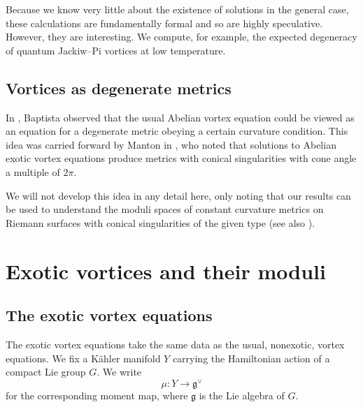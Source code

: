 \documentclass[10pt]{article}
\theoremstyle{definition}
\begin{document}
Because we know very little about the existence of solutions in the general case, these calculations are fundamentally formal and so are highly speculative. However, they are interesting. We compute, for example, the expected degeneracy of quantum Jackiw--Pi vortices at low temperature.

\subsection{Vortices as degenerate metrics}

In \cite{baptistaVDM}, Baptista observed that the usual Abelian vortex equation could be viewed as an equation for a degenerate metric obeying a certain curvature condition. This idea was carried forward by Manton in \cite{mantonFVE}, who noted that solutions to Abelian exotic vortex equations produce metrics with conical singularities with cone angle a multiple of \(2\pi\). 

We will not develop this idea in any detail here, only noting that our results can be used to understand the moduli spaces of constant curvature metrics on Riemann surfaces with conical singularities of the given type (see also \cite{chenCM,eremenkoMC,mazzeoCM}).



\section{Exotic vortices and their moduli}
\label{sec:evm}

\subsection{The exotic vortex equations}

The exotic vortex equations take the same data as the usual, nonexotic, vortex equations. We fix a K\"ahler manifold \(Y\) carrying the Hamiltonian action of a compact Lie group \(G\). We write
\[
\mu : Y \to \mathfrak{g}^\vee
\]
for the corresponding moment map, where \(\mathfrak{g}\) is the Lie algebra of \(G\).
\end{document}
